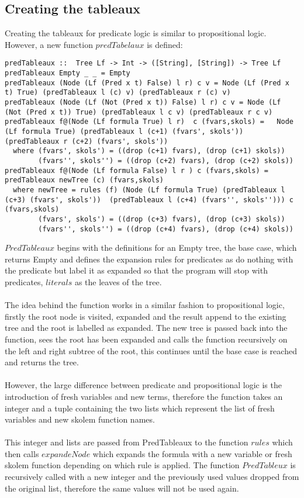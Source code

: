 \documentclass{article}%
\begin{document}
\subsection{Creating the tableaux}
Creating the tableaux for predicate logic is similar to propositional logic. However, a new function $predTabelaux$ is defined: 
\begin{verbatim}
predTableaux ::  Tree Lf -> Int -> ([String], [String]) -> Tree Lf 
predTableaux Empty _ _ = Empty
predTableaux (Node (Lf (Pred x t) False) l r) c v = Node (Lf (Pred x t) True) (predTableaux l (c) v) (predTableaux r (c) v)
predTableaux (Node (Lf (Not (Pred x t)) False) l r) c v = Node (Lf (Not (Pred x t)) True) (predTableaux l c v) (predTableaux r c v)
predTableaux f@(Node (Lf formula True) l r)  c (fvars,skols) =   Node (Lf formula True) (predTableaux l (c+1) (fvars', skols')) (predTableaux r (c+2) (fvars', skols'))
  where (fvars', skols') = ((drop (c+1) fvars), (drop (c+1) skols))
        (fvars'', skols'') = ((drop (c+2) fvars), (drop (c+2) skols))
predTableaux f@(Node (Lf formula False) l r ) c (fvars,skols) = predTableaux newTree (c) (fvars,skols)
  where newTree = rules (f) (Node (Lf formula True) (predTableaux l (c+3) (fvars', skols'))  (predTableaux l (c+4) (fvars'', skols''))) c (fvars,skols)
        (fvars', skols') = ((drop (c+3) fvars), (drop (c+3) skols))
        (fvars'', skols'') = ((drop (c+4) fvars), (drop (c+4) skols))
\end{verbatim}
$PredTableaux$ begins with the definitions for an Empty tree, the base case, which returns Empty and defines the expansion rules for predicates as do nothing with the predicate but label it as expanded so that the program will stop with predicates, $literals$ as the leaves of the tree. \\\\
The idea behind the function works in a similar fashion to propositional logic, firstly the root node is visited, expanded and the result append to the existing tree and the root is labelled as expanded. The new tree is passed back into the function,  sees the root has been expanded and calls the function recursively on the left and right subtree of the root, this continues until the base case is reached and returns the tree. \\\\
However, the large difference between predicate and propositional logic is the introduction of fresh variables and new terms, therefore the function takes an integer and a tuple containing the two lists which represent the list of fresh variables and new skolem function names. \\\\
This integer and lists are passed from PredTableaux to the function $rules$ which then calls $expandeNode$ which expands the formula with a new variable or fresh skolem function depending on which rule is applied. The function $PredTableux$ is recursively called with a new integer and the previously used values dropped from the original list, therefore the same values will not be used again. 
\end{document}

